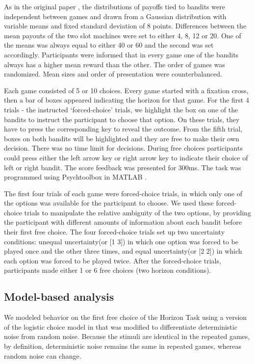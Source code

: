 \documentclass[12pt]{article}
\begin{document}
{As in the original paper \citep{wilson2014}, the distributions of payoffs tied to bandits were independent between games and drawn from a Gaussian distribution with variable means and fixed standard deviation of 8 points. Differences between the mean payouts of the two slot machines were set to either 4, 8, 12 or 20. One of the means was always equal to either 40 or 60 and the second was set accordingly. Participants were informed that in every game one of the bandits always has a higher mean reward than the other. The order of games was randomized. Mean sizes and order of presentation were counterbalanced. 

Each game consisted of 5 or 10 choices. Every game started with a fixation cross, then a bar of boxes appeared indicating the horizon for that game. For the first 4 trials - the instructed `forced-choice' trials, we highlight the box on one of the bandits to instruct the participant to choose that option. On these trials, they have to press the corresponding key to reveal the outcome. From the fifth trial, boxes on both bandits will be highlighted and they are free to make their own decision. There was no time limit for decisions. During free choices participants could press either the left arrow key or right arrow key to indicate their choice of left or right bandit. The score feedback was presented for 300ms. The task was programmed using Psychtoolbox in MATLAB \citep{psychtoolbox1, psychtoolbox2}. 

The first four trials of each game were forced-choice trials, in which only one of the options was available for the participant to choose. We used these forced-choice trials to manipulate the relative ambiguity of the two options, by providing the participant with different amounts of information about each bandit before their first free choice. The four forced-choice trials set up two uncertainty conditions: unequal uncertainty(or [1 3]) in which one option was forced to be played once and the other three times, and equal uncertainty(or [2 2]) in which each option was forced to be played twice. After the forced-choice trials, participants made either 1 or 6 free choices (two horizon conditions).

\subsection*{Model-based analysis}
We modeled behavior on the first free choice of the Horizon Task using a version of the logistic choice model in \cite{wilson2014} that was modified to differentiate deterministic noise from random noise. Because the stimuli are identical in the repeated games, by definition, deterministic noise remains the same in repeated games, whereas random noise can change. 

}
\end{document}
